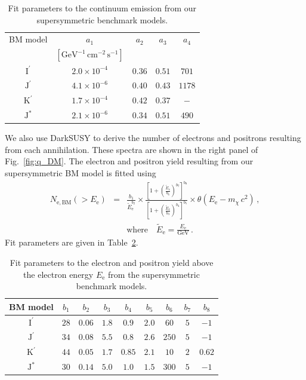 \documentclass[10pt,aps,pra,reprint,amsmath,amsfonts,amssymb,showpacs,nofootinbib,floatfix]{revtex4-1}
\newcommand{\rmn}{\mathrm}
\newcommand{\ee}{E_\rmn{e}}
\newcommand{\Kp}{\rmn{K}^\prime}
\newcommand{\Ip}{\rmn{I}^\prime}
\newcommand{\Js}{\rmn{J}^*}
\newcommand{\Jp}{\rmn{J}^\prime}
\newcommand{\cm}{\rmn{cm}}
\newcommand{\eet}{\tilde{E}_\rmn{e}}
\newcommand{\gev}{\rmn{GeV}}
\newcommand{\e}{\rmn{e}}
\begin{document}
\begin{table}[h]
\begin{tabular}{c c c c c }
\hline
\hline
 BM model & $a_1$ & $a_2$  & $a_3$ & $a_4$ \\
          & $[\gev^{-1}\,\cm^{-2}\,\rmn{s}^{-1}]$ & & & \\
 \hline
$\Ip$ & $2.0\times10^{-4}$ & $0.36$ & $0.51$ & $701$  \\
$\Jp$ & $4.1\times10^{-6}$ & $0.40$ & $0.43$ & $1178$ \\
$\Kp$ & $1.7\times10^{-4}$ & $0.42$ & $0.37$ & $-$    \\
$\Js$ & $2.1\times10^{-6}$ & $0.34$ & $0.51$ & $490$  \\
\hline
\hline
\end{tabular}
\caption{Fit parameters to the continuum emission from our
  supersymmetric benchmark models.
 \label{tab:bm_cont}}
\end{table} 

We also use {\sc DarkSUSY} to derive the number of electrons and
positrons resulting from each annihilation. These spectra are shown in
the right panel of Fig.~\ref{fig:q_DM}. The electron and positron
yield resulting from our supersymmetric BM model is fitted using
\begin{eqnarray}
N_{\e,\rmn{BM}}(>\ee) &=& \frac{b_1}{\eet^{b_2}}\times
\frac{\left[1+\left(\frac{\eet}{b_6}\right)^{b_7}\right]^{b_8}}
{\left[1+\left(\frac{\eet}{b_3}\right)^{b_4}\right]^{b_5}}
\times\theta(\ee-m_\chi\,c^2)\,,\nonumber\\
& &\rmn{where}\quad\eet=\frac{\ee}{\gev}\,.
\label{eq:bm_elec}
\end{eqnarray}
Fit parameters are given in Table~\ref{tab:bm_elec}.
\begin{table}[h]
\begin{tabular}{c c c c c c c c c}
\hline
\hline
 BM model & $b_1$ & $b_2$ & $b_3$ & $b_4$ & $b_5$ & $b_6$ & $b_7$ & $b_8$ \\
 \hline
$\Ip$ & $28$ & $0.06$ & $1.8$ & $0.9$  & $2.0$ & $60$  & $5$ & $-1$     \\
$\Jp$ & $34$ & $0.08$ & $5.5$ & $0.8$  & $2.6$ & $250$ & $5$ & $-1$     \\
$\Kp$ & $44$ & $0.05$ & $1.7$ & $0.85$ & $2.1$ & $10$  & $2$ & $0.62$   \\
$\Js$ & $30$ & $0.14$ & $5.0$ & $1.0$  & $1.5$ & $300$ & $5$ & $-1$     \\
\hline
\hline
\end{tabular}
\caption{Fit parameters to the electron and positron yield
  above the electron energy $\ee$ from the supersymmetric benchmark
  models.
 \label{tab:bm_elec}}
\end{table} 
\end{document}
